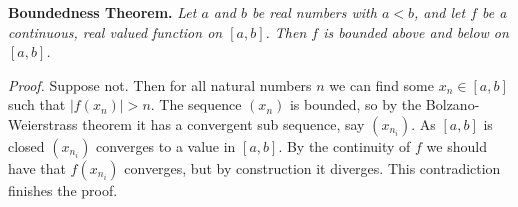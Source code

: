 \documentclass[12pt]{article}
\begin{document}
{\bf Boundedness Theorem. }
{\it
Let $a$ and $b$ be real numbers with $a<b$, and let $f$ be a continuous, real valued function on $[a,b]$. Then $f$ is bounded above and below on $[a,b]$.
}

{\it Proof. }
Suppose not. Then for all natural numbers $n$ we can find some $x_n \in [a,b]$ such that $|f(x_n)|>n$. The sequence $(x_n)$ is bounded, so by the Bolzano-Weierstrass theorem it has a convergent sub sequence, say $(x_{n_i})$. As $[a,b]$ is closed $(x_{n_i})$ converges to a value in $[a,b]$. By the continuity of $f$ we should have that $f(x_{n_i})$ converges, but by construction it diverges. This contradiction finishes the proof.
\end{document}
